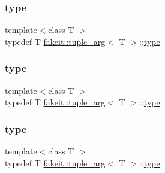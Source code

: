 \subsubsection{\texorpdfstring{type}{type}\hspace{0.1cm}{\footnotesize\ttfamily [1/9]}}
{\footnotesize\ttfamily template$<$class T $>$ \\
typedef T \mbox{\hyperlink{structfakeit_1_1tuple__arg}{fakeit\+::tuple\+\_\+arg}}$<$ T $>$\+::\mbox{\hyperlink{structfakeit_1_1tuple__arg_abaa55c1c51c4f37325b54def32256f1d}{type}}}

\mbox{\label{structfakeit_1_1tuple__arg_abaa55c1c51c4f37325b54def32256f1d}} 
\subsubsection{\texorpdfstring{type}{type}\hspace{0.1cm}{\footnotesize\ttfamily [2/9]}}
{\footnotesize\ttfamily template$<$class T $>$ \\
typedef T \mbox{\hyperlink{structfakeit_1_1tuple__arg}{fakeit\+::tuple\+\_\+arg}}$<$ T $>$\+::\mbox{\hyperlink{structfakeit_1_1tuple__arg_abaa55c1c51c4f37325b54def32256f1d}{type}}}

\mbox{\label{structfakeit_1_1tuple__arg_abaa55c1c51c4f37325b54def32256f1d}} 
\subsubsection{\texorpdfstring{type}{type}\hspace{0.1cm}{\footnotesize\ttfamily [3/9]}}
{\footnotesize\ttfamily template$<$class T $>$ \\
typedef T \mbox{\hyperlink{structfakeit_1_1tuple__arg}{fakeit\+::tuple\+\_\+arg}}$<$ T $>$\+::\mbox{\hyperlink{structfakeit_1_1tuple__arg_abaa55c1c51c4f37325b54def32256f1d}{type}}}

\mbox{\label{structfakeit_1_1tuple__arg_abaa55c1c51c4f37325b54def32256f1d}} 
